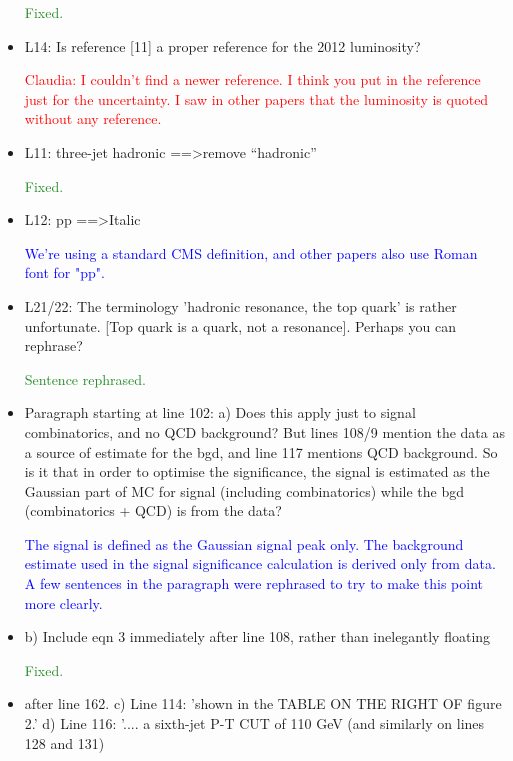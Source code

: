 \documentclass[paper=a4, fontsize=11pt]{scrartcl}
\begin{document}
\begin{itemize}
\textcolor{ForestGreen}{Fixed.}\\

\item L14: 
Is reference [11] a proper reference for the 2012 luminosity? 

\textcolor{Red}{Claudia: I couldn't find a newer reference. I think you put in the reference 
just for the uncertainty. I saw in other papers that the luminosity is quoted without any reference.}\\

\item L11: 
three-jet hadronic ==\textgreater remove “hadronic” 

\textcolor{ForestGreen}{Fixed.}\\

\item L12: 
pp ==\textgreater Italic 

\textcolor{Blue}{We're using a standard CMS definition, and other papers also use Roman font for "pp".}\\

\item L21/22: 
The terminology 'hadronic resonance, the top quark' is rather unfortunate. 
[Top quark is a quark, not a resonance]. Perhaps you can rephrase? 

\textcolor{ForestGreen}{Sentence rephrased.}\\

\item Paragraph starting at line 102: 
a) Does this apply just to signal combinatorics, and no QCD background? But 
lines 108/9 mention the data as a source of estimate for the bgd, and line 
117 mentions QCD background. So is it that in order to optimise the 
significance, the signal is estimated as the Gaussian part of MC for signal 
(including combinatorics) while the bgd (combinatorics + QCD) is from the 
data? 

\textcolor{Blue}{The signal is defined as the Gaussian signal peak only. The background estimate used in the signal significance calculation is derived only from data. A few sentences in the paragraph were rephrased to try to make this point more clearly.}\\

\item b) Include eqn 3 immediately after line 108, rather than inelegantly floating 

\textcolor{ForestGreen}{Fixed.}\\

\item after line 162. 
c) Line 114: 'shown in the TABLE ON THE RIGHT OF figure 2.' 
d) Line 116: '.... a sixth-jet P-T CUT of 110 GeV 
(and similarly on lines 128 and 131) 


\end{itemize}
\end{document}
